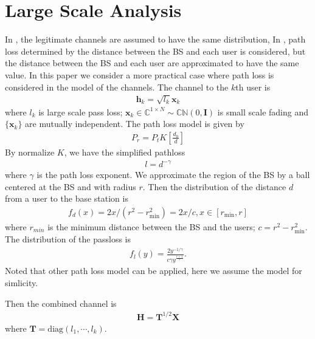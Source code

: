 \documentclass[12pt,journal,draftclsnofoot,onecolumn]{IEEEtran}
\begin{document}
\section{Large Scale Analysis}
In \cite{geraci2012secrecy}, the legitimate channels are assumed to have the same distribution, In \cite{geraci2014physical}, path loss determined by the distance between the BS and each user is considered, but the distance between the BS and each user are approximated to have the same value.  In this paper we consider a more practical case where path loss is considered in the model of the channels.
The channel to the $k$th user is
\begin{eqnarray}
\mathbf{h}_k = \sqrt{l_k}\mathbf{x}_k
\end{eqnarray}
where $l_k$ is large scale pass loss; $\mathbf{x}_k \in \mathbb{C}^{1 \times N} \sim \mathbb{CN}(0,\mathbf{I})$ is small scale fading and $\{\mathbf{x}_k\}$ are mutually independent. 
The path loss model is given by
\begin{eqnarray}
P_r = P_tK\left[\frac{d_0}{d}\right]
\end{eqnarray}
By normalize $K$, we have the simplified pathloss
\begin{eqnarray}
l = d^{-\gamma}
\end{eqnarray}
where $\gamma$ is the path loss exponent.  We approximate the region
of the BS by a ball centered at the BS and with radius $r$. Then the distribution of the distance $d$ from a user to the base station is 
\begin{eqnarray}
f_d(x) = 2x/(r^2 -r_{\mathrm{min}}^2) = 2x/c, x \in [r_{\mathrm{min}}, r]
\end{eqnarray}
where $r_{min}$ is the minimum distance between the BS and the users; $c = r^2 -r_{\mathrm{min}}^2$. The distribution of the passloss is 
\begin{eqnarray}
f_l(y) = \frac{2y^{-1/\gamma}}{c\gamma y^{\frac{r+1}{\gamma}}} \label{eq:distribution_of_l}.
\end{eqnarray}
Noted that other path loss model can be applied, here we assume the model for simlicity.

Then the combined channel is 
\begin{eqnarray}
\mathbf{H} = \mathbf{T}^{1/2}\mathbf{X}
\end{eqnarray}
where $\mathbf{T} = \mathrm{diag}\left(l_1,\cdots,l_k\right)$.
\end{document}

